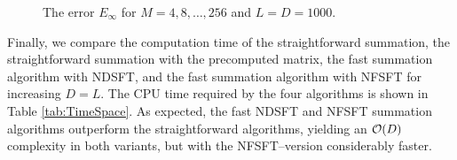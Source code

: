\documentclass[11pt,a4paper,twoside,bibtotoc]{scrartcl}
\theoremstyle{plain}
\theoremstyle{definition}
\theoremstyle{remark}
\numberwithin{equation}{section}
\numberwithin{table}{section}
\numberwithin{figure}{section}
\begin{document}
\begin{figure}[tb]
  \centering
  \hfill
  \caption{The error $E_{\infty}$ for $M = 4,8,\ldots,256$ and $L = D = 1000$.}
  \label{Figure:PoissonTest}
\end{figure}

Finally, we compare the computation time of the straightforward summation, the
straightforward summation with the precomputed matrix, the fast summation
algorithm with NDSFT, and the fast summation algorithm with NFSFT for
increasing $D=L$. 
The CPU time required by the four algorithms is shown in Table
\ref{tab:TimeSpace}. 
As expected, the fast NDSFT and NFSFT summation algorithms outperform the 
straightforward algorithms, yielding an ${\cal O}(D)$ complexity in both 
variants, but with the NFSFT--version considerably faster.
\end{document}
